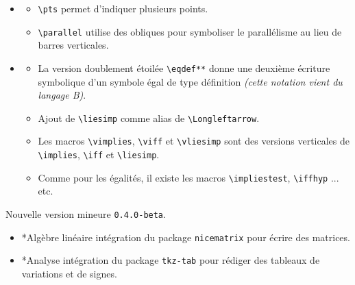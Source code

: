 \documentclass[12pt,a4paper]{book}
\makeatletter
\newcommand\env[1]{\texttt{#1}}
\newcommand\macro[1]{\env{\textbackslash{}#1}}
\theoremstyle{definition}
\newcommand\topic{\@ifstar{\@topic@star}{\@topic@no@star}}
\newcommand\@topic@no@star[1]{%
	\textbf{\textsc{#1}.}%
}
\newcommand\@topic@star[1]{%
	\textbf{\textsc{#1} :}%
}
\makeatother
\begin{document}
{{\begin{description}
\begin{itemize}[itemsep=.5em]
    
    
    
        \item \topic{Géométrie}
        \begin{itemize}[itemsep=.5em]
            \item \macro{pts} permet d'indiquer plusieurs points.
    
            \item \macro{parallel} utilise des obliques pour symboliser le parallélisme au lieu de barres verticales.
        \end{itemize}
    
    
    
    
        \item \topic{Logique}
        \begin{itemize}[itemsep=.5em]
            \item La version doublement étoilée \macro{eqdef**} donne une deuxième écriture symbolique d'un symbole égal de type définition \emph{(cette notation vient du langage B)}.
    
            \item Ajout de \macro{liesimp} comme alias de \macro{Longleftarrow}.
    
            \item Les macros \macro{vimplies}, \macro{viff} et \macro{vliesimp} sont des versions verticales de \macro{implies}, \macro{iff} et \macro{liesimp}.
    
            \item Comme pour les égalités, il existe les macros \macro{impliestest}, \macro{iffhyp} ... etc.
        \end{itemize}
    \end{itemize}


    \medskip
    \item[2019-09-06] Nouvelle version mineure \verb+0.4.0-beta+.
    
    \begin{itemize}[itemsep=.5em]
        \item \topic*{Algèbre linéaire}
              intégration du package \verb+nicematrix+ pour écrire des matrices.
    
    
    
    
        \item \topic*{Analyse}
              intégration du package \verb+tkz-tab+ pour rédiger des tableaux de variations et de signes.
    

\end{itemize}
\end{description}}}
\end{document}
